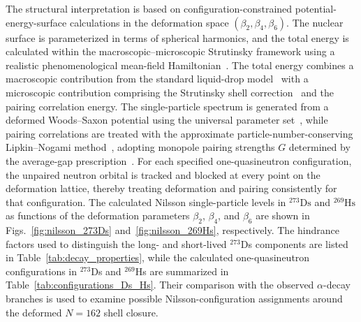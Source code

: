 \documentclass[11pt]{article}
\begin{document}
The structural interpretation is based on configuration-constrained potential-energy-surface calculations in the deformation space $(\beta_2,\beta_4,\beta_6)$. 
The nuclear surface is parameterized in terms of spherical harmonics, and the total energy is calculated within the macroscopic--microscopic Strutinsky framework using a realistic phenomenological mean-field Hamiltonian~\cite{brack1972FunnyHillsShellCorrection,xu1998MultiquasiparticlePotentialenergySurfaces,meng2022LandscapeAppreciationSystematic}.
The total energy combines a macroscopic contribution from the standard liquid-drop model~\cite{myersNUCLEARMASSESDEFORMATIONS} with a microscopic contribution comprising the Strutinsky shell correction~\cite{strutinsky1967ShellEffectsNuclear} and the pairing correlation energy. 
The single-particle spectrum is generated from a deformed Woods--Saxon potential using the universal parameter set~\cite{CWIOK1987379}, while pairing correlations are treated with the approximate particle-number-conserving Lipkin--Nogami method~\cite{PRADHAN1973357}, adopting monopole pairing strengths $G$ determined by the average-gap prescription~\cite{MOLLER199220}. 
For each specified one-quasineutron configuration, the unpaired neutron orbital is tracked and blocked at every point on the deformation lattice, thereby treating deformation and pairing consistently for that configuration. 
The calculated Nilsson single-particle levels in
$^{273}\mathrm{Ds}$ and $^{269}\mathrm{Hs}$ as functions of the
deformation parameters $\beta_{2}$, $\beta_{4}$, and $\beta_{6}$
are shown in Figs.~\ref{fig:nilsson_273Ds} and~\ref{fig:nilsson_269Hs},
respectively.
The hindrance factors used to distinguish the long- and short-lived $^{273}$Ds components are listed in Table~\ref{tab:decay_properties}, while the calculated one-quasineutron configurations in $^{273}$Ds and $^{269}$Hs are summarized in Table~\ref{tab:configurations_Ds_Hs}. Their comparison with the observed $\alpha$-decay branches is used to examine possible Nilsson-configuration assignments around the deformed $N=162$ shell closure.
\end{document}
